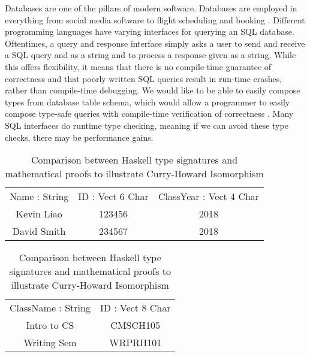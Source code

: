 Databases are one of the pillars of modern software. Databases are employed in
everything from social media software \cite{tao} to flight scheduling and
booking \cite{flights}. Different programming languages have varying interfaces
for querying an SQL database. Oftentimes, a query and response interface simply
asks a user to send and receive a SQL query and as a string and to process a
response given as a string. While this offers flexibility, it means that there
is no compile-time guarantee of correctness and that poorly written SQL queries
result in run-time crashes, rather than compile-time debugging. We would like to
be able to easily compose types from database table schema, which would allow a
programmer to easily compose type-safe queries with compile-time verification of
correctness \cite{power_of_pi}. Many SQL interfaces do runtime type checking,
meaning if we can avoid these type checks, there may be performance gains. 

\begin{table}[h]
    \centering
    \begin{tabular}{|c|c|c|}
        Name : String & ID : Vect 6 Char & ClassYear : Vect 4 Char \\
        Kevin Liao    & 123456           & 2018                    \\
        David Smith   & 234567           & 2018
    \end{tabular}
    \caption{Comparison between Haskell type signatures and mathematical proofs to illustrate Curry-Howard Isomorphism}
    \label{students}
\end{table}

\begin{table}[h]
    \centering
    \begin{tabular}{|c|c|}
        ClassName : String & ID : Vect 8 Char\\
        Intro to CS        & CMSCH105        \\
        Writing Sem        & WRPRH101
    \end{tabular}
    \caption{Comparison between Haskell type signatures and mathematical proofs to illustrate Curry-Howard Isomorphism}
    \label{classes}
\end{table}

